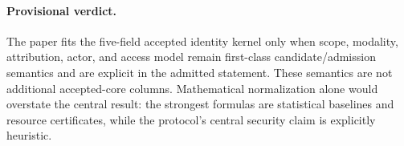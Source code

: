 \paragraph{Provisional verdict.}
The paper fits the five-field accepted identity kernel only when scope, modality, attribution, actor, and access model remain first-class candidate/admission semantics and are explicit in the admitted statement. These semantics are not additional accepted-core columns. Mathematical normalization alone would overstate the central result: the strongest formulas are statistical baselines and resource certificates, while the protocol's central security claim is explicitly heuristic.
